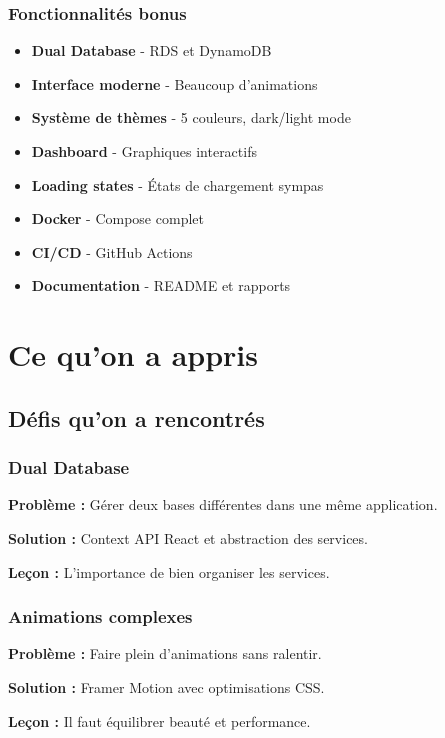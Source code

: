 \documentclass[12pt,a4paper]{report}
\begin{document}
\subsection{Fonctionnalités bonus}
\begin{itemize}[label=\textcolor{primary}{$\star$}]
    \item \textbf{Dual Database} - RDS et DynamoDB
    \item \textbf{Interface moderne} - Beaucoup d'animations
    \item \textbf{Système de thèmes} - 5 couleurs, dark/light mode
    \item \textbf{Dashboard} - Graphiques interactifs
    \item \textbf{Loading states} - États de chargement sympas
    \item \textbf{Docker} - Compose complet
    \item \textbf{CI/CD} - GitHub Actions
    \item \textbf{Documentation} - README et rapports
\end{itemize}

\chapter{Ce qu'on a appris}

\section{Défis qu'on a rencontrés}

\subsection{Dual Database}
\textbf{Problème :} Gérer deux bases différentes dans une même application.

\textbf{Solution :} Context API React et abstraction des services.

\textbf{Leçon :} L'importance de bien organiser les services.

\subsection{Animations complexes}
\textbf{Problème :} Faire plein d'animations sans ralentir.

\textbf{Solution :} Framer Motion avec optimisations CSS.

\textbf{Leçon :} Il faut équilibrer beauté et performance.
\end{document}
